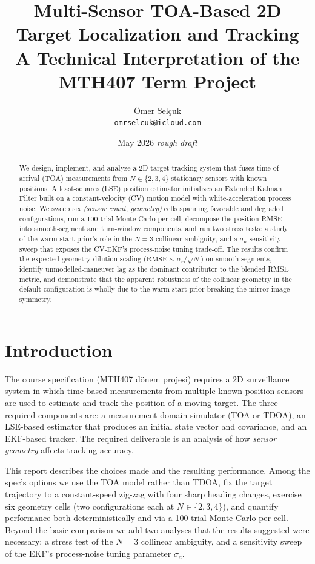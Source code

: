 \documentclass[11pt,a4paper]{article}
\title{Multi-Sensor TOA-Based 2D Target Localization and Tracking\\
       \large A Technical Interpretation of the MTH407 Term Project}
\author{Ömer Selçuk \\ \texttt{omrselcuk@icloud.com}}
\date{May 2026 \quad\textit{rough draft}}
\begin{document}
\maketitle

\begin{abstract}
We design, implement, and analyze a 2D target tracking system that fuses
time-of-arrival (TOA) measurements from $N \in \{2,3,4\}$ stationary sensors
with known positions. A least-squares (LSE) position estimator initializes an
Extended Kalman Filter built on a constant-velocity (CV) motion model with
white-acceleration process noise. We sweep six \emph{(sensor count, geometry)}
cells spanning favorable and degraded configurations, run a 100-trial Monte
Carlo per cell, decompose the position RMSE into smooth-segment and
turn-window components, and run two stress tests: a study of the warm-start
prior's role in the $N{=}3$ collinear ambiguity, and a $\sigma_a$ sensitivity
sweep that exposes the CV-EKF's process-noise tuning trade-off. The results
confirm the expected geometry-dilution scaling
($\text{RMSE} \sim \sigma_r / \sqrt{N}$) on smooth segments, identify
unmodelled-maneuver lag as the dominant contributor to the blended RMSE
metric, and demonstrate that the apparent robustness of the collinear
geometry in the default configuration is wholly due to the warm-start prior
breaking the mirror-image symmetry.
\end{abstract}

\section{Introduction}

The course specification (MTH407 dönem projesi) requires a 2D surveillance
system in which time-based measurements from multiple known-position sensors
are used to estimate and track the position of a moving target.  The three
required components are: a measurement-domain simulator (TOA or TDOA), an
LSE-based estimator that produces an initial state vector and covariance, and
an EKF-based tracker.  The required deliverable is an analysis of how
\emph{sensor geometry} affects tracking accuracy.

This report describes the choices made and the resulting performance.  Among
the spec's options we use the TOA model rather than TDOA, fix the target
trajectory to a constant-speed zig-zag with four sharp heading changes,
exercise six geometry cells (two configurations each at $N \in \{2,3,4\}$),
and quantify performance both deterministically and via a 100-trial Monte
Carlo per cell.  Beyond the basic comparison we add two analyses that the
results suggested were necessary: a stress test of the $N{=}3$ collinear
ambiguity, and a sensitivity sweep of the EKF's process-noise tuning
parameter $\sigma_a$.
\end{document}
